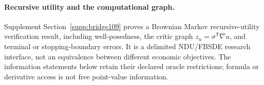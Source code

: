 \documentclass[ecta,nameyear,draft]{econsocart}
\begin{document}







\paragraph{Recursive utility and the computational graph.}
Supplement Section~\ref{supp:bridge109} proves a Brownian Markov recursive-utility verification result, including well-posedness, the critic graph $z_u=\sigma^{\mathsf T}\nabla u$, and terminal or stopping-boundary errors. It is a delimited NDU/FBSDE research interface, not an equivalence between different economic objectives. The information statements below retain their declared oracle restrictions; formula or derivative access is not free point-value information.











\end{document}
